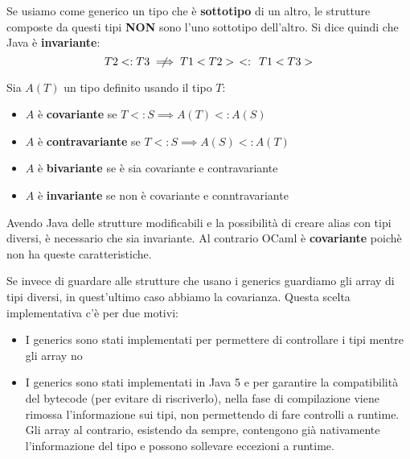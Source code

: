 \noindent Se usiamo come generico un tipo che è \textbf{sottotipo} di un altro, le strutture composte da questi tipi \textbf{NON} sono l'uno sottotipo dell'altro. Si dice quindi che Java è \textbf{invariante}:
\begin{equation*}
	T2 <: T3 \centernot\implies T1<T2> \:\: <: \:\: T1<T3>
\end{equation*}
\begin{note}
	Sia $A(T)$ un tipo definito usando il tipo $T$:
	\begin{itemize}
		\item $A$ è \textbf{covariante} se $T<:S \implies A(T) <: A(S)$
		\item $A$ è \textbf{contravariante} se $T<:S \implies A(S) <: A(T)$
		\item $A$ è \textbf{bivariante} se è sia covariante e contravariante
		\item $A$ è \textbf{invariante} se non è covariante e conntravariante
	\end{itemize}
\end{note}
Avendo Java delle strutture modificabili e la possibilità di creare alias con tipi diversi, è necessario che sia invariante. Al contrario OCaml è \textbf{covariante} poichè non ha queste caratteristiche.
\begin{note}
	Se invece di guardare alle strutture che usano i generics guardiamo gli array di tipi diversi, in quest'ultimo caso abbiamo la covarianza. Questa scelta implementativa c'è per due motivi:
	\begin{itemize}
		\item I generics sono stati implementati per permettere di controllare i tipi mentre gli array no
		\item I generics sono stati implementati in Java 5 e per garantire la compatibilità del bytecode (per evitare di riscriverlo), nella fase di compilazione viene rimossa l'informazione sui tipi, non permettendo di fare controlli a runtime. Gli array al contrario, esistendo da sempre, contengono già nativamente l'informazione del tipo e possono sollevare eccezioni a runtime.
	\end{itemize}
\end{note}
